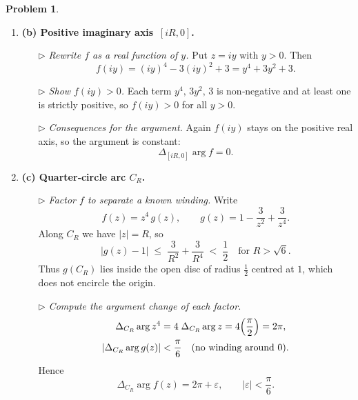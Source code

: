 \documentclass[12pt]{article}
\theoremstyle{definition} %
\newtheorem{problem}{Problem}
\theoremstyle{plain} %
\begin{document}
\begin{problem}
\begin{enumerate}
        \item \textbf{(b) Positive imaginary axis $\,[iR,0]$.}

              \begin{enumerate}
                  \item[$\triangleright$] \emph{Rewrite $f$ as a real function of $y$.}  
                        Put $z=iy$ with $y>0$.  Then
                        $$
                            f(iy) = (iy)^{4}-3(iy)^{2}+3 = y^{4}+3y^{2}+3.
                        $$
                  \item[$\triangleright$] \emph{Show $f(iy)>0$.}  
                        Each term $y^{4},\,3y^{2},\,3$ is non‑negative and at least one is strictly positive, so $f(iy)>0$ for all $y>0$.
                  \item[$\triangleright$] \emph{Consequences for the argument.}  
                        Again $f(iy)$ stays on the positive real axis, so the argument is constant:
                        $$\Delta_{[iR,0]}\arg f = 0.$$
              \end{enumerate}

        \item \textbf{(c) Quarter‑circle arc $C_R$.}

              \begin{enumerate}
                  \item[$\triangleright$] \emph{Factor $f$ to separate a known winding.}  
                        Write
                        $$
                            f(z) = z^{4}\,g(z), \qquad
                            g(z)=1-\frac{3}{z^{2}}+\frac{3}{z^{4}}.
                        $$
                        Along $C_R$ we have $|z|=R$, so
                        $$
                            |g(z)-1|
                            \;\le\;
                            \frac{3}{R^{2}}+\frac{3}{R^{4}}
                            \;<\;
                            \frac12
                            \quad\text{for }R>\sqrt6.
                        $$
                        Thus $g(C_R)$ lies inside the open disc of radius $\tfrac12$ centred at $1$, which does not encircle the origin.
                  \item[$\triangleright$] \emph{Compute the argument change of each factor.}  
                        \begin{align}
                            \Delta_{C_R}\arg z^{4} &= 4\;\Delta_{C_R}\arg z
                                                    = 4\Bigl(\frac{\pi}{2}\Bigr)
                                                    = 2\pi,\\
                            |\Delta_{C_R}\arg g(z)| &< \frac{\pi}{6}
                            \quad\text{(no winding around $0$).}
                        \end{align}
                        Hence
                        $$
                            \Delta_{C_R}\arg f(z)
                            = 2\pi + \varepsilon,
                            \qquad |\varepsilon|<\frac{\pi}{6}.
                        $$
              \end{enumerate}


\end{enumerate}
\end{problem}
\end{document}
